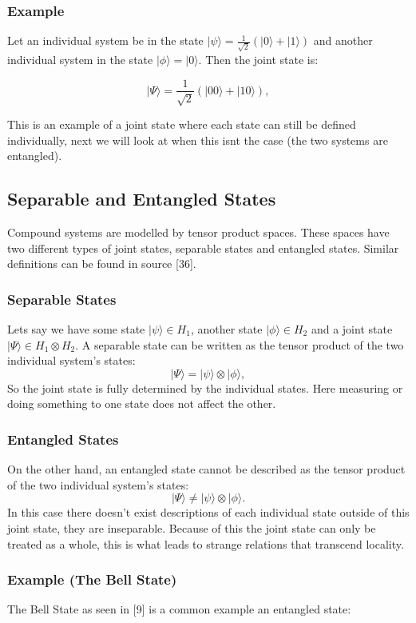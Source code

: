 \subsubsection{Example}
Let an individual system be in the state \( |\psi\rangle = \frac{1}{\sqrt{2}}(|0\rangle + |1\rangle) \) and another individual system in the state \( |\phi\rangle = |0\rangle \). Then the joint state is:

\[
|\Psi\rangle = \frac{1}{\sqrt{2}}(|00\rangle + |10\rangle),
\]


\noindent This is an example of a joint state where each state can still be defined individually, next we will look at when this isnt the case (the two systems are entangled).

\subsection{Separable and Entangled States}
Compound systems are modelled by tensor product spaces. These spaces have two different types of joint states, separable states and entangled states. Similar definitions can be found in source [36].


\subsubsection{Separable States}
\noindent Lets say we have some state \( |\psi\rangle \in H_1 \), another state \( |\phi\rangle \in H_2 \) and a joint state \( |\Psi\rangle \in H_1 \otimes H_2 \). A separable state can be written as the tensor product of the two individual system's states:
\[
|\Psi\rangle = |\psi\rangle \otimes |\phi\rangle,
\]
\noindent So the joint state is fully determined by the individual states. Here measuring or doing something to one state does not affect the other.

\subsubsection{Entangled States}
On the other hand, an entangled state cannot be described as the tensor product of the two individual system's states:
\[
|\Psi\rangle \neq |\psi\rangle \otimes |\phi\rangle.
\]
\noindent In this case there doesn't exist descriptions of each individual state outside of this joint state, they are inseparable. Because of this the joint state can only be treated as a whole, this is what leads to strange relations that transcend locality. 


\subsubsection{Example (The Bell State)}
The Bell State as seen in [9] is a common example an entangled state:

